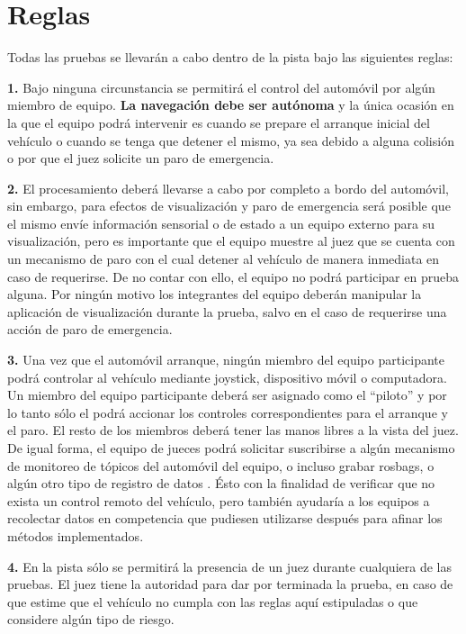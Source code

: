 \documentclass[letterpaper,12pt]{article}
\begin{document}
\section{Reglas}

Todas las pruebas se llevarán a cabo dentro de la pista bajo las siguientes reglas:

\textbf{1.} Bajo ninguna circunstancia se permitirá el control del automóvil por algún miembro de equipo. \textbf{La navegación debe ser autónoma} y la única ocasión en la que el equipo podrá intervenir es cuando se prepare el arranque inicial del vehículo o cuando se tenga que detener el mismo, ya sea debido a alguna colisión o por que el juez solicite un paro de emergencia.

\textbf{2.} El procesamiento deberá llevarse a cabo por completo a bordo del automóvil, sin embargo, para efectos de visualización y paro de emergencia será posible que el mismo envíe información sensorial o de estado a un equipo externo para su visualización, pero es importante
que el equipo muestre al juez que se cuenta con un mecanismo de paro con el cual detener al vehículo de manera inmediata en caso de requerirse. De no contar con ello, el equipo no podrá participar en prueba alguna. Por ningún motivo los integrantes del equipo deberán manipular la
aplicación de visualización durante la prueba, salvo en el caso de requerirse una acción de paro de emergencia.

\textbf{3.} Una vez que el automóvil arranque, ningún miembro del equipo participante podrá controlar al vehículo mediante joystick, dispositivo móvil o computadora. Un miembro del equipo participante deberá ser asignado como el ``piloto'' y por lo tanto sólo el podrá accionar los controles correspondientes para el arranque y el paro. El resto de los miembros deberá tener las manos libres a la vista del juez. De igual forma, el equipo de jueces podrá solicitar suscribirse a algún mecanismo de monitoreo de tópicos del automóvil del equipo, o incluso grabar
rosbags, o algún otro tipo de registro de datos . Ésto con la finalidad de verificar que no exista un control remoto del vehículo, pero también ayudaría a los equipos a recolectar datos en competencia que pudiesen utilizarse después para afinar los métodos implementados.

\textbf{4.} En la pista sólo se permitirá la presencia de un juez durante cualquiera de las pruebas. El juez tiene la autoridad para dar por terminada la prueba, en caso de que estime que el vehículo no cumpla con las reglas aquí estipuladas o que considere algún tipo de riesgo.
\end{document}
